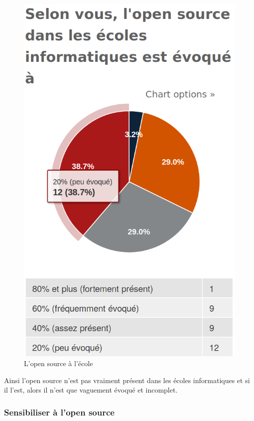 				\begin{figure}[!htb]
					\center
					\includegraphics[scale=0.28]{./img/a5}
					\caption{L'open source à l'école}					
				\end{figure}

				Ainsi l'open source n'est pas vraiment présent dans les écoles informatiques et si il l'est, alors il n'est que vaguement évoqué et incomplet.

			\subsubsection{Sensibiliser à l'open source}

